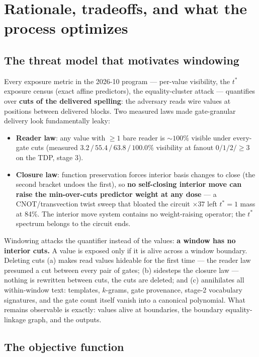 \documentclass[11pt]{article}
\newcommand{\tstar}{t^{*}}
\begin{document}
\section{Rationale, tradeoffs, and what the process optimizes}

\subsection{The threat model that motivates windowing}

Every exposure metric in the 2026-10 program --- per-value visibility, the
$\tstar$ exposure census (exact affine predictors), the equality-cluster
attack --- quantifies over \textbf{cuts of the delivered spelling}: the
adversary reads wire values at positions between delivered blocks. Two
measured laws made gate-granular delivery look fundamentally leaky:

\begin{itemize}
\item \textbf{Reader law}: any value with $\geq 1$ bare reader is
  ${\sim}100\%$ visible under every-gate cuts (measured
  $3.2\,/\,55.4\,/\,63.8\,/\,100.0\%$ visibility at fanout
  $0/1/2/{\geq}3$ on the TDP, stage 3).
\item \textbf{Closure law}: function preservation forces interior basis
  changes to close (the second bracket undoes the first), so \textbf{no
  self-closing interior move can raise the min-over-cuts predictor weight at
  any dose} --- a CNOT/transvection twist sweep that bloated the circuit
  $\times 37$ left $\tstar{=}1$ mass at 84\%. The interior move system
  contains no weight-raising operator; the $\tstar$ spectrum belongs to the
  circuit ends.
\end{itemize}

Windowing attacks the quantifier instead of the values: \textbf{a window has
no interior cuts.} A value is exposed only if it is alive across a window
boundary. Deleting cuts (a) makes read values hideable for the first time
--- the reader law presumed a cut between every pair of gates; (b) sidesteps
the closure law --- nothing is rewritten between cuts, the cuts are deleted;
and (c) annihilates all within-window text: templates, $k$-grams, gate
provenance, stage-2 vocabulary signatures, and the gate count itself vanish
into a canonical polynomial. What remains observable is exactly: values alive
at boundaries, the boundary equality-linkage graph, and the outputs.

\subsection{The objective function}
\end{document}
